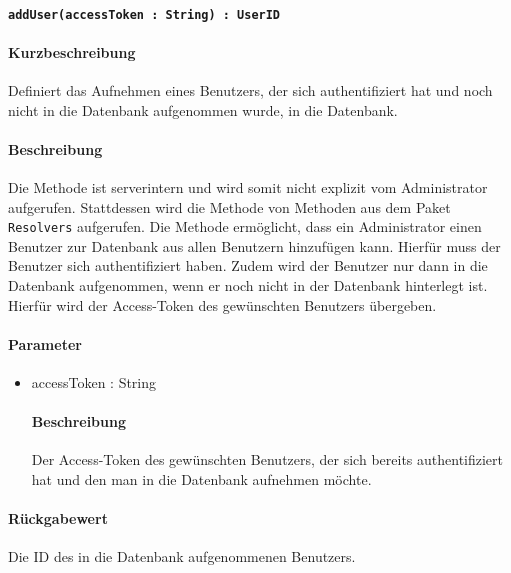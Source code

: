 \paragraph{\texttt{addUser(accessToken : String) : UserID}}%
\paragraph*{Kurzbeschreibung}
Definiert das Aufnehmen eines Benutzers, der sich authentifiziert hat und noch nicht in die Datenbank aufgenommen wurde, in die Datenbank.
\paragraph*{Beschreibung}
Die Methode ist serverintern und wird somit nicht explizit vom Administrator aufgerufen.
Stattdessen wird die Methode von Methoden aus dem Paket \texttt{Resolvers} aufgerufen.
Die Methode ermöglicht, dass ein Administrator einen Benutzer zur Datenbank aus allen Benutzern hinzufügen kann. Hierfür muss der Benutzer sich authentifiziert haben. 
Zudem wird der Benutzer nur dann in die Datenbank aufgenommen, wenn er noch nicht in der Datenbank hinterlegt ist.
Hierfür wird der Access-Token des gewünschten Benutzers übergeben.
\paragraph*{Parameter}
\begin{itemize}
    \item accessToken : String
    		\paragraph*{Beschreibung}
    		Der Access-Token des gewünschten Benutzers, der sich bereits authentifiziert hat und den man in die Datenbank aufnehmen möchte.
\end{itemize}
\paragraph*{Rückgabewert}
Die ID des in die Datenbank aufgenommenen Benutzers.
